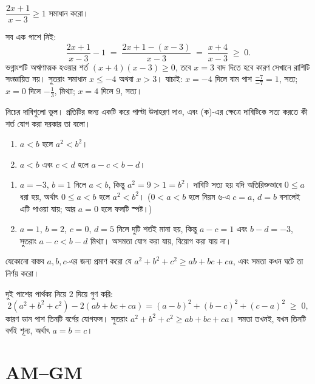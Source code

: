 \documentclass[11pt]{article}
\begin{document}
 $\dfrac{2x+1}{x-3} \geq 1$ সমাধান করো।

\begin{sol}
সব এক পাশে নিই:
\[
  \frac{2x+1}{x-3} - 1 \;=\; \frac{2x + 1 - (x-3)}{x-3} \;=\; \frac{x+4}{x-3} \;\geq\; 0 .
\]
ভগ্নাংশটি অঋণাত্মক হওয়ার শর্ত $(x+4)(x-3) \geq 0$, তবে $x = 3$ বাদ দিতে হবে
কারণ সেখানে রাশিটি সংজ্ঞায়িত নয়। সুতরাং সমাধান $x \leq -4$ অথবা $x > 3$।
যাচাই: $x = -4$ দিলে বাম পাশ $\frac{-7}{-7} = 1$, সত্য; $x = 0$ দিলে
$-\frac{1}{3}$, মিথ্যা; $x = 4$ দিলে $9$, সত্য।
\end{sol}

 নিচের দাবিগুলো ভুল। প্রতিটির জন্য একটি করে পাল্টা উদাহরণ দাও, এবং
(ক)-এর ক্ষেত্রে দাবিটিকে সত্য করতে কী শর্ত যোগ করা দরকার তা বলো।
\begin{enumerate}
  \item $a < b$ হলে $a^2 < b^2$।
  \item $a < b$ এবং $c < d$ হলে $a - c < b - d$।
\end{enumerate}

\begin{sol}
\begin{enumerate}
  \item $a = -3$, $b = 1$ নিলে $a < b$, কিন্তু $a^2 = 9 > 1 = b^2$। দাবিটি সত্য
        হয় যদি অতিরিক্তভাবে $0 \leq a$ ধরা হয়, অর্থাৎ $0 \leq a < b$ হলে
        $a^2 < b^2$। ($0 < a < b$ হলে নিয়ম ৬-এ $c = a$, $d = b$ বসালেই এটি
        পাওয়া যায়; আর $a = 0$ হলে ফলটি স্পষ্ট।)
  \item $a = 1$, $b = 2$, $c = 0$, $d = 5$ নিলে দুটি শর্তই মানা হয়, কিন্তু
        $a - c = 1$ এবং $b - d = -3$, সুতরাং $a - c < b - d$ মিথ্যা। অসমতা
        যোগ করা যায়, বিয়োগ করা যায় না।
\end{enumerate}
\end{sol}

 যেকোনো বাস্তব $a, b, c$-এর জন্য প্রমাণ করো যে
$a^2 + b^2 + c^2 \geq ab + bc + ca$, এবং সমতা কখন ঘটে তা নির্ণয় করো।

\begin{sol}
দুই পাশের পার্থক্য নিয়ে $2$ দিয়ে গুণ করি:
\[
  2(a^2+b^2+c^2) - 2(ab+bc+ca)
  = (a-b)^2 + (b-c)^2 + (c-a)^2 \;\geq\; 0 ,
\]
কারণ ডান পাশ তিনটি বর্গের যোগফল। সুতরাং $a^2+b^2+c^2 \geq ab+bc+ca$। সমতা তখনই,
যখন তিনটি বর্গই শূন্য, অর্থাৎ $a = b = c$।
\end{sol}

\section{AM--GM}
\end{document}

